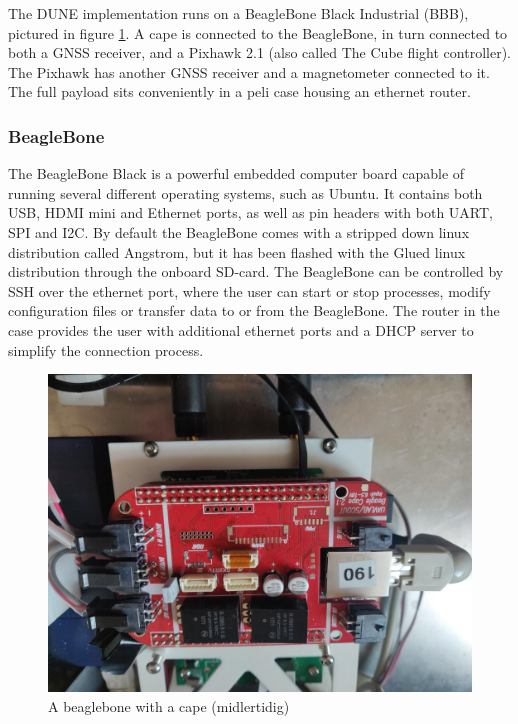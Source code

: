     The DUNE implementation runs on a BeagleBone Black Industrial (BBB), pictured in figure \ref{fig:bbb}. A cape is connected to the BeagleBone, in turn connected to both a GNSS receiver, and a Pixhawk 2.1 (also called The Cube flight controller). The Pixhawk has another GNSS receiver and a magnetometer connected to it. The full payload sits conveniently in a peli case housing an ethernet router.\\
    
    \subsubsection{BeagleBone}
    The BeagleBone Black is a powerful embedded computer board capable of running several different operating systems, such as Ubuntu. It contains both USB, HDMI mini and Ethernet ports, as well as pin headers with both UART, SPI and I2C. By default the BeagleBone comes with a stripped down linux distribution called Angstrom, but it has been flashed with the Glued linux distribution through the onboard SD-card. The BeagleBone can be controlled by SSH over the ethernet port, where the user can start or stop processes, modify configuration files or transfer data to or from the BeagleBone. The router in the case provides the user with additional ethernet ports and a DHCP server to simplify the connection process.
    
    \begin{figure}
        \centering
        \includegraphics[scale=0.1]{Implementation/Images/BBB.jpg}
        \caption{A beaglebone with a cape (midlertidig)}
        \label{fig:bbb}
    \end{figure}
    
